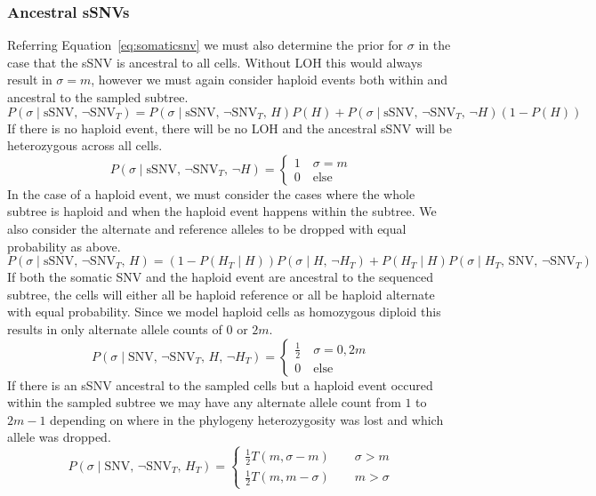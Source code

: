 \documentclass[../main.tex]{subfiles}
\begin{document}
\subsubsection*{Ancestral sSNVs}
Referring Equation~\eqref{eq:somaticsnv} we must also determine the prior for $\sigma$ in the case that the sSNV is ancestral to all cells. Without LOH this would always result in $\sigma=m$, however we must again consider haploid events both within and ancestral to the sampled subtree.
\begin{equation} \label{eq:ancestralsnv}
P(\sigma\mid\text{sSNV},\,\neg\text{SNV}_T)=P(\sigma\mid\text{sSNV},\,\neg\text{SNV}_T,\,H)P(H)+P(\sigma\mid\text{sSNV},\,\neg\text{SNV}_T,\,\neg H)(1-P(H))
\end{equation}
If there is no haploid event, there will be no LOH and the ancestral sSNV will be heterozygous across all cells.
\begin{equation*}
P(\sigma\mid\text{sSNV},\,\neg\text{SNV}_T,\,\neg H) = \begin{cases}1\quad \sigma=m\\ 0\quad\text{else}\end{cases}
\end{equation*}
In the case of a haploid event, we must consider the cases where the whole subtree is haploid and when the haploid event happens within the subtree. We also consider the alternate and reference alleles to be dropped with equal probability as above.
\begin{equation*}
P(\sigma\mid\text{sSNV},\,\neg\text{SNV}_T,\,H)=(1-P(H_T\mid H))P(\sigma\mid H,\,\neg H_T)+P(H_T\mid H)P(\sigma\mid H_T,\,\text{SNV},\,\neg\text{SNV}_T)
\end{equation*}
If both the somatic SNV and the haploid event are ancestral to the sequenced subtree, the cells will either all be haploid reference or all be haploid alternate with equal probability. Since we model haploid cells as homozygous diploid this results in only alternate allele counts of $0$ or $2m$.
\begin{equation*}
P(\sigma\mid\text{SNV},\,\neg\text{SNV}_T,\,H,\,\neg H_T)= \begin{cases} \frac{1}{2} \quad \sigma=0,2m\\0\quad \text{else} \end{cases}
\end{equation*}
If there is an sSNV ancestral to the sampled cells but a haploid event occured within the sampled subtree we may have any alternate allele count from $1$ to $2m-1$ depending on where in the phylogeny heterozygosity was lost and which allele was dropped.
\begin{equation*}
P(\sigma\mid\text{SNV},\,\neg\text{SNV}_T,\,H_T) = \begin{cases} \frac{1}{2}T(m,\sigma-m)\qquad \sigma > m\\
\frac{1}{2}T(m,m-\sigma)\qquad m > \sigma \end{cases}
\end{equation*}
\end{document}
